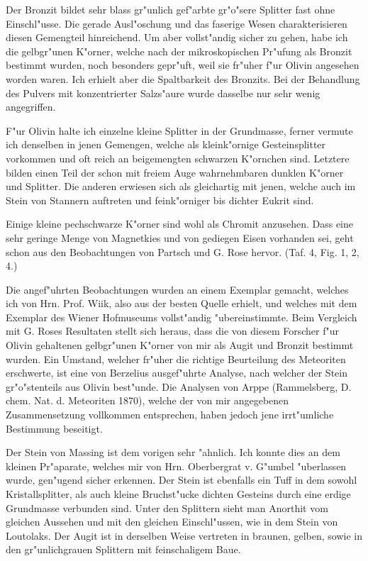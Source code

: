 \documentclass[a4paper, 11pt, oneside, polutonikogreek, german]{article}
\begin{document}
Der Bronzit bildet sehr blass gr"unlich gef"arbte gr"o"sere Splitter fast ohne Einschl"usse. Die gerade Ausl"oschung und das faserige Wesen charakterisieren diesen Gemengteil hinreichend. Um aber vollst"andig sicher zu gehen, habe ich die gelbgr"unen K"orner, welche nach der mikroskopischen Pr"ufung als Bronzit bestimmt wurden, noch besonders gepr"uft, weil sie fr"uher f"ur Olivin angesehen worden waren. Ich erhielt aber die Spaltbarkeit des Bronzits. Bei der Behandlung des Pulvers mit konzentrierter Salzs"aure wurde dasselbe nur sehr wenig angegriffen.

F"ur Olivin halte ich einzelne kleine Splitter in der Grundmasse, ferner vermute ich denselben in jenen Gemengen, welche als kleink"ornige Gesteinsplitter vorkommen und oft reich an beigemengten schwarzen K"ornchen sind. Letztere bilden einen Teil der schon mit freiem Auge wahrnehmbaren dunklen K"orner und Splitter. Die anderen erwiesen sich als gleichartig mit jenen, welche auch im Stein von Stannern auftreten und feink"orniger bis dichter Eukrit sind.

Einige kleine pechschwarze K"orner sind wohl als Chromit anzusehen. Dass eine sehr geringe Menge von Magnetkies und von gediegen Eisen vorhanden sei, geht schon aus den Beobachtungen von Partsch und G. Rose hervor. (Taf. 4, Fig. 1, 2, 4.)

Die angef"uhrten Beobachtungen wurden an einem Exemplar gemacht, welches ich von Hrn. Prof. Wiik, also aus der besten Quelle erhielt, und welches mit dem Exemplar des Wiener Hofmuseums vollst"andig "ubereinstimmte. Beim Vergleich mit G. Roses Resultaten stellt sich heraus, dass die von diesem Forscher f"ur Olivin gehaltenen gelbgr"unen K"orner von mir als Augit und Bronzit bestimmt wurden. Ein Umstand, welcher fr"uher die richtige Beurteilung des Meteoriten erschwerte, ist eine von Berzelius ausgef"uhrte Analyse, nach welcher der Stein gr"o"stenteils aus Olivin best"unde. Die Analysen von Arppe (Rammelsberg, D. chem. Nat. d. Meteoriten 1870), welche der von mir angegebenen Zusammensetzung vollkommen entsprechen, haben jedoch jene irrt"umliche Bestimmung beseitigt.

Der Stein von Massing ist dem vorigen sehr "ahnlich. Ich konnte dies an dem kleinen Pr"aparate, welches mir von Hrn. Oberbergrat v. G"umbel "uberlassen wurde, gen"ugend sicher erkennen. Der Stein ist ebenfalls ein Tuff in dem sowohl Kristallsplitter, als auch kleine Bruchst"ucke dichten Gesteins durch eine erdige Grundmasse verbunden sind. Unter den Splittern sieht man Anorthit vom gleichen Aussehen und mit den gleichen Einschl"ussen, wie in dem Stein von Loutolaks. Der Augit ist in derselben Weise vertreten in braunen, gelben, sowie in den gr"unlichgrauen Splittern mit feinschaligem Baue.
\end{document}
